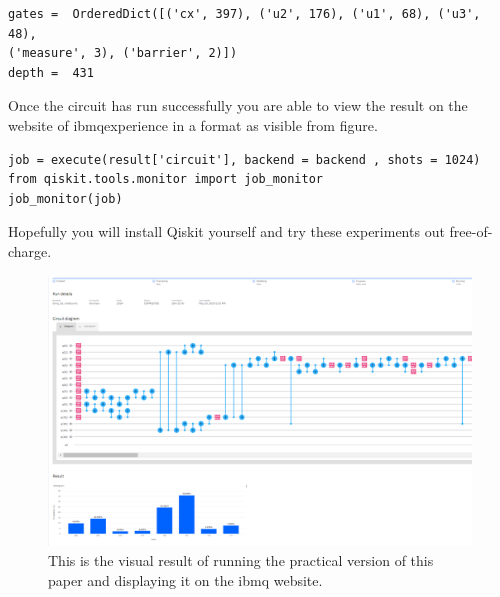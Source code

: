 \begin{verbatim}
gates =  OrderedDict([('cx', 397), ('u2', 176), ('u1', 68), ('u3', 48),
('measure', 3), ('barrier', 2)])
depth =  431
\end{verbatim}

Once the circuit has run successfully you are able to view the result on the website of ibmqexperience in a format as visible from figure.

\begin{verbatim}
job = execute(result['circuit'], backend = backend , shots = 1024)
from qiskit.tools.monitor import job_monitor
job_monitor(job)
\end{verbatim}

Hopefully you will install Qiskit yourself and try these experiments out free-of-charge.



\begin{figure}
	\centering
	\includegraphics[scale = 0.50]{../Demonstration/img/ibmq_result.PNG}
	\caption{This is the visual result of running the practical version of this paper and displaying it on the ibmq website.}
\end{figure}
